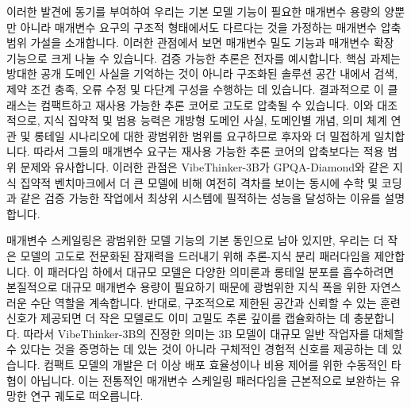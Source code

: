 \documentclass{article}
\begin{document}


이러한 발견에 동기를 부여하여 우리는 기본 모델 기능이 필요한 매개변수 용량의 양뿐만 아니라 매개변수 요구의 구조적 형태에서도 다르다는 것을 가정하는 매개변수 압축 범위 가설을 소개합니다. 이러한 관점에서 보면 매개변수 밀도 기능과 매개변수 확장 기능으로 크게 나눌 수 있습니다. 검증 가능한 추론은 전자를 예시합니다. 핵심 과제는 방대한 공개 도메인 사실을 기억하는 것이 아니라 구조화된 솔루션 공간 내에서 검색, 제약 조건 충족, 오류 수정 및 다단계 구성을 수행하는 데 있습니다. 결과적으로 이 클래스는 컴팩트하고 재사용 가능한 추론 코어로 고도로 압축될 수 있습니다. 이와 대조적으로, 지식 집약적 및 범용 능력은 개방형 도메인 사실, 도메인별 개념, 의미 체계 연관 및 롱테일 시나리오에 대한 광범위한 범위를 요구하므로 후자와 더 밀접하게 일치합니다. 따라서 그들의 매개변수 요구는 재사용 가능한 추론 코어의 압축보다는 적용 범위 문제와 유사합니다. 이러한 관점은 VibeThinker-3B가 GPQA-Diamond와 같은 지식 집약적 벤치마크에서 더 큰 모델에 비해 여전히 격차를 보이는 동시에 수학 및 코딩과 같은 검증 가능한 작업에서 최상위 시스템에 필적하는 성능을 달성하는 이유를 설명합니다.

매개변수 스케일링은 광범위한 모델 기능의 기본 동인으로 남아 있지만, 우리는 더 작은 모델의 고도로 전문화된 잠재력을 드러내기 위해 추론-지식 분리 패러다임을 제안합니다. 이 패러다임 하에서 대규모 모델은 다양한 의미론과 롱테일 분포를 흡수하려면 본질적으로 대규모 매개변수 용량이 필요하기 때문에 광범위한 지식 폭을 위한 자연스러운 수단 역할을 계속합니다. 반대로, 구조적으로 제한된 공간과 신뢰할 수 있는 훈련 신호가 제공되면 더 작은 모델로도 이미 고밀도 추론 깊이를 캡슐화하는 데 충분합니다. 따라서 VibeThinker-3B의 진정한 의미는 3B 모델이 대규모 일반 작업자를 대체할 수 있다는 것을 증명하는 데 있는 것이 아니라 구체적인 경험적 신호를 제공하는 데 있습니다. 컴팩트 모델의 개발은 더 이상 배포 효율성이나 비용 제어를 위한 수동적인 타협이 아닙니다. 이는 전통적인 매개변수 스케일링 패러다임을 근본적으로 보완하는 유망한 연구 궤도로 떠오릅니다.
\end{document}
